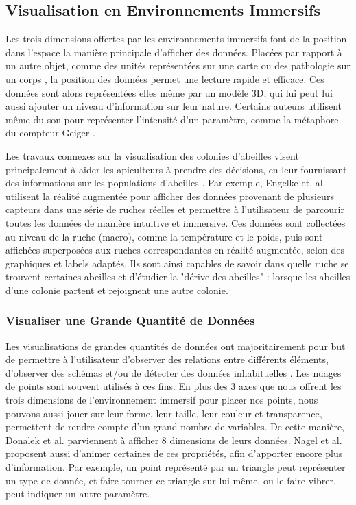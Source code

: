 	\subsection{Visualisation en Environnements Immersifs}
	
	Les trois dimensions offertes par les environnements immersifs font de la position dans l'espace la manière principale d'afficher des données. Placées par rapport à un autre objet, comme des unités représentées sur une carte \cite{durbin_battlefield_1998} ou des pathologie sur un corps \cite{coffey_interactive_2012}, la position des données permet une lecture rapide et efficace. Ces données sont alors représentées elles même par un modèle 3D, qui lui peut lui aussi ajouter un niveau d'information sur leur nature. Certains auteurs utilisent même du son pour représenter l'intensité d'un paramètre, comme la métaphore du compteur Geiger \cite{frohlich_exploring_1999}.
	
	
		
		Les travaux connexes sur la visualisation des colonies d'abeilles visent principalement à aider les apiculteurs à prendre des décisions, en leur fournissant des informations sur les populations d'abeilles \cite{engelke_visual_2016, engelke_melissar_2016, nguyen_augmented_2017}. Par exemple, Engelke et. al. \cite{engelke_visual_2016} utilisent la réalité augmentée pour afficher des données provenant de plusieurs capteurs dans une série de ruches réelles et permettre à l'utilisateur de parcourir toutes les données de manière intuitive et immersive. Ces données sont collectées au niveau de la ruche (macro), comme la température et le poids, puis sont affichées superposées aux ruches correspondantes en réalité augmentée, selon des graphiques et labels adaptés. Ils sont ainsi capables de savoir dans quelle ruche se trouvent certaines abeilles et d'étudier la "dérive des abeilles" : lorsque les abeilles d'une colonie partent et rejoignent une autre colonie.
	
	\subsubsection{Visualiser une Grande Quantité de Données}
	
	 Les visualisations de grandes quantités de données ont majoritairement pour but de permettre à l'utilisateur d'observer des relations entre différents éléments, d'observer des schémas et/ou de détecter des données inhabituelles \cite{nagel_methods_2001}.
	Les nuages de points sont souvent utilisés à ces fins. En plus des 3 axes que nous offrent les trois dimensions de l'environnement immersif pour placer nos points, nous pouvons aussi jouer sur leur forme, leur taille, leur couleur et transparence, permettent de rendre compte d'un grand nombre de variables. De cette manière, Donalek et al. \cite{donalek_immersive_2014} parviennent à afficher 8 dimensions de leurs données. Nagel et al. \cite{nagel_methods_2001} proposent aussi d'animer certaines de ces propriétés, afin d'apporter encore plus d'information. Par exemple, un point représenté par un triangle peut représenter un type de donnée, et faire tourner ce triangle sur lui même, ou le faire vibrer, peut indiquer un autre paramètre.
	
